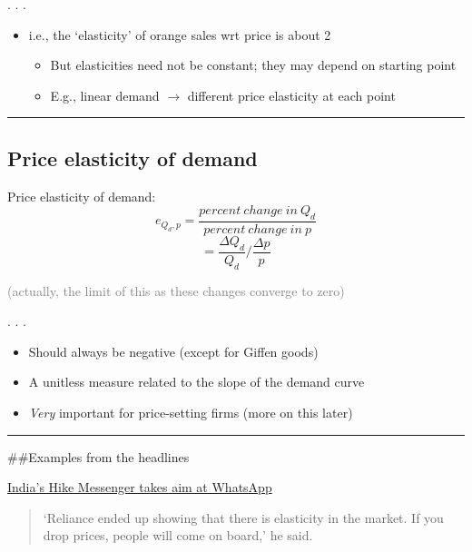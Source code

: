 \documentclass[]{article}
\begin{document}
. . .

\begin{itemize}
\item
  i.e., the `elasticity' of orange sales wrt price is about 2 \pause

  \begin{itemize}
  \item
    But elasticities need not be constant; they may depend on starting
    point
  \item
    E.g., linear demand \(\rightarrow\) different price elasticity at
    each point
  \end{itemize}
\end{itemize}

\begin{center}\rule{0.5\linewidth}{\linethickness}\end{center}

\hypertarget{price-elasticity-of-demand}{%
\subsection{Price elasticity of
demand}\label{price-elasticity-of-demand}}

Price elasticity of demand:
\[e_{Q_d,p} = \frac{percent \ change \ in \ Q_d}{percent \ change \ in \ p} \]
\[  = \frac{\Delta Q_d}{Q_d}/\frac{\Delta p}{p}\]

\textcolor{gray}{(actually, the limit of this as these changes converge to zero)}

. . .

\begin{itemize}
\item
  Should always be negative (except for Giffen goods)
\item
  A unitless measure related to the slope of the demand curve
\item
  \emph{Very} important for price-setting firms (more on this later)
\end{itemize}

\begin{center}\rule{0.5\linewidth}{\linethickness}\end{center}

\#\#Examples from the headlines

\href{https://www.ft.com/content/2665c794-76a0-11e6-b60a-de4532d5ea35}{India's
Hike Messenger takes aim at WhatsApp}

\begin{quote}
`Reliance ended up showing that there is elasticity in the market. If
you drop prices, people will come on board,' he said.
\end{quote}
\end{document}
